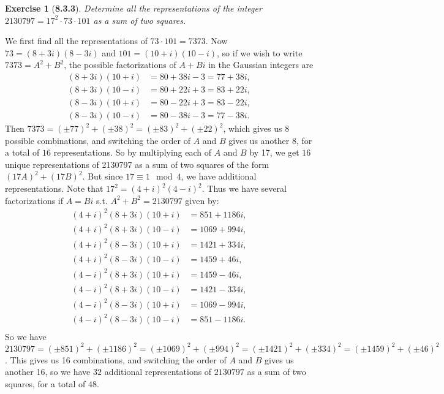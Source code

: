 \documentclass[10pt,oneside,reqno]{amsart}
\theoremstyle{plain}
\newtheorem*{e}{Exercise}
\theoremstyle{definition}
\begin{document}
\begin{e}[\textbf{8.3.3}]
Determine all the representations of the integer $2130797 = 17^2 \cdot 73 \cdot 101$ as a sum of two squares. 
\end{e}
We first find all the representations of $73 \cdot 101 = 7373$. Now $73 = (8 + 3i)(8 -3i)$ and $101 = (10 + i)(10 - i)$, so if we wish to write $7373 = A^2 + B^2$, the possible factorizations of $A + Bi$ in the Gaussian integers are 
\begin{equation}
\begin{aligned}
(8 + 3i)(10  + i) &= 80 + 38i - 3 = 77 + 38i,\\
(8 + 3i)(10  - i) &= 80 +  22i + 3 = 83 + 22i,\\
(8 - 3i)(10  + i) &= 80 - 22i + 3 = 83 - 22i,\\
(8 - 3i)(10  - i) &= 80 - 38i - 3 = 77- 38i.
\end{aligned}
\end{equation}
Then $7373 = (\pm 77)^2 + (\pm 38)^2 = (\pm 83)^2 + (\pm 22)^2$, which gives us 8 possible combinations, and switching the order of $A$ and $B$ gives us another $8$, for a total of $16$ representations. So by multiplying each of $A$ and $B$ by 17, we get $16$ unique representations of 2130797 as a sum of two squares of the form $(17A)^2 + (17B)^2$. But since $17 \equiv 1 \mod 4$, we have additional representations. Note that $17^2 = (4 + i)^2(4 - i)^2$. Thus we have several factorizations if $A = Bi$ s.t. $A^2 + B^2 = 2130797$ given by:
\begin{equation}
\begin{aligned}
(4 + i)^2(8 + 3i)(10  + i) &= 851 + 1186i,\\
(4 + i)^2(8 + 3i)(10  - i) &= 1069 + 994i,\\
(4 + i)^2(8 - 3i)(10  + i) &= 1421 + 334i,\\
(4 + i)^2(8 - 3i)(10  - i) &= 1459  + 46i,\\
(4 - i)^2(8 + 3i)(10  + i) &=1459  - 46i,\\
(4 - i)^2(8 + 3i)(10  - i) &= 1421 - 334i,\\
(4 - i)^2(8 - 3i)(10  + i) &= 1069 - 994i,\\
(4 - i)^2(8 - 3i)(10  - i) &= 851 - 1186i.\\
\end{aligned}
\end{equation}
So we have $2130797 = (\pm851)^2 + (\pm1186)^2 = (\pm 1069)^2 + (\pm 994)^2 = (\pm 1421)^2 + (\pm 334)^2 = (\pm 1459)^2 + (\pm 46)^2$. This gives us 16 combinations, and switching the order of $A$ and $B$ gives us another 16, so we have $32$ additional representations of $2130797$ as a sum of two squares, for a total of $48$. \\
\end{document}
